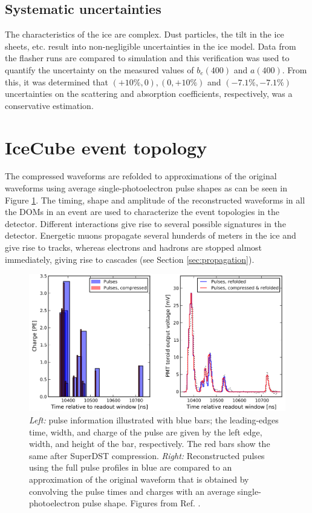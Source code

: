 \subsection{Systematic uncertainties}
The characteristics of the ice are complex. Dust particles, the tilt in the ice sheets, etc. result into non-negligible uncertainties in the ice model. Data from the flasher runs are compared to simulation and this verification was used to quantify the uncertainty on the measured values of $b_e(400)$ and $a(400)$. From this, it was determined that $(+10\%,0), (0,+10\%)$ and $(-7.1\%,-7.1\%)$ uncertainties on the scattering and absorption coefficients, respectively, was a conservative estimation.

\section{IceCube event topology}
The compressed waveforms are refolded to approximations of the original waveforms using average single-photoelectron pulse shapes as can be seen in Figure \ref{fig:waveform}. The timing, shape and amplitude of the reconstructed waveforms in all the DOMs in an event are used to characterize the event topologies in the detector. Different interactions give rise to several possible signatures in the detector. Energetic muons propagate several hunderds of meters in the ice and give rise to tracks, whereas electrons and hadrons are stopped almost immediately, giving rise to cascades (see Section \ref{sec:propagation}).

\begin{figure}[t]
\centering
\includegraphics[width=\textwidth]{chapter5/img/waveform.png}
\caption{\textit{Left:} pulse information illustrated with blue bars; the leading-edges time, width, and charge of the pulse are given by the left edge, width, and height of the bar, respectively. The red bars show the same after SuperDST compression. \textit{Right: }Reconstructed pulses using the full pulse profiles in blue are compared to an approximation of the original waveform that is obtained by convolving the pulse times and charges with an average single-photoelectron pulse shape. Figures from Ref. \cite{waveforms}.}
\label{fig:waveform}
\end{figure}

